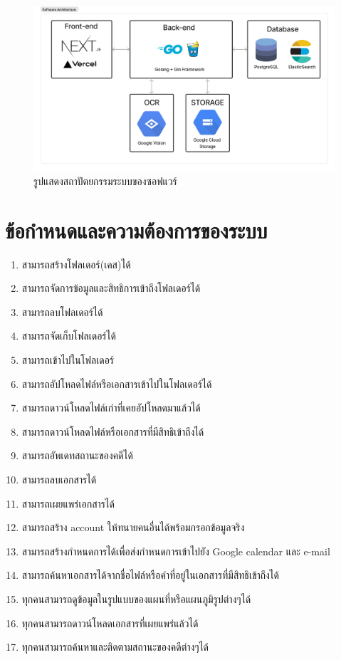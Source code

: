 \documentclass[12pt,oneside,openright,a4paper]{cpe-thai-project}
\begin{document}
\begin{figure}[!h]\centering
  \includegraphics[width=13cm]{./assets/software-architecture.png}
  \caption{รูปแสดงสถาปัตยกรรมระบบของซอฟแวร์}\label{fig:systemArch}
\end{figure}

\newpage
\section{ข้อกำหนดและความต้องการของระบบ}
\begin{enumerate}
  \item สามารถสร้างโฟลเดอร์(เคส)ได้
  \item สามารถจัดการข้อมูลและสิทธิการเข้าถึงโฟลเดอร์ได้
  \item สามารถลบโฟลเดอร์ได้
  \item สามารถจัดเก็บโฟลเดอร์ได้
  \item สามารถเข้าไปในโฟลเดอร์
  \item สามารถอัปโหลดไฟล์หรือเอกสารเข้าไปในโฟลเดอร์ได้
  \item สามารถดาวน์โหลดไฟล์เก่าที่เคยอัปโหลดมาแล้วได้
  \item สามารถดาวน์โหลดไฟล์หรือเอกสารที่มีสิทธิเข้าถึงได้
  \item สามารถอัพเดทสถานะของคดีได้
  \item สามารถลบเอกสารได้
  \item สามารถเผยแพร่เอกสารได้
  \item สามารถสร้าง account ให้ทนายคนอื่นได้พร้อมกรอกข้อมูลจริง
  \item สามารถสร้างกําหนดการได้เพื่อส่งกําหนดการเข้าไปยัง Google calendar และ  e-mail
  \item สามารถค้นหาเอกสารได้จากชื่อไฟล์หรือคําที่อยู่ในเอกสารที่มีสิทธิเข้าถึงได้
  \item ทุกคนสามารถดูข้อมูลในรูปแบบของแผนที่หรือแผนภูมิรูปต่างๆได้
  \item ทุกคนสามารถดาวน์โหลดเอกสารที่เผยแพร่แล้วได้
  \item ทุกคนสามารถค้นหาและติดตามสถานะของคดีต่างๆได้
\end{enumerate}
\end{document}
